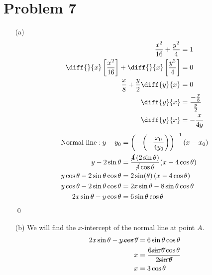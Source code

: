\documentclass{article}
\begin{document}
\section*{Problem 7}
\begin{itemize}
\item[(a)]
	\begin{align*}
		\frac{x^2}{16}+\frac{y^2}{4}&=1 \\
		\diff{}{x}\left[\frac{x^2}{16}\right]+\diff{}{x}\left[\frac{y^2}{4}\right]&=0 \\
		\frac{x}{8}+\frac{y}{2}\diff{y}{x}&=0 \\
		\diff{y}{x}&=\frac{-\frac{x}{8}}{\frac{y}{2}} \\
		\diff{y}{x}&=-\frac{x}{4y}
	\end{align*}
	\begin{align*}
		\text{Normal line}:y-y_0&=\left(-\left(-\frac{x_0}{4y_0}\right)\right)^{-1}(x-x_0) \\
		y-2\sin\theta&=\frac{\cancel{4}\left(2\sin\theta\right)}{\cancel{4}\cos\theta}(x-4\cos\theta) \\
		y\cos\theta-2\sin\theta\cos\theta&=2\sin(\theta)\left(x-4\cos\theta\right) \\
		y\cos\theta-2\sin\theta\cos\theta&=2x\sin\theta-8\sin\theta\cos\theta \\
		2x\sin\theta-y\cos\theta&=6\sin\theta\cos\theta
	\end{align*}
	\qed

\item[(b)]
	We will find the $x$-intercept of the normal line at point $A$.
	\begin{align*}
		2x\sin\theta-\cancel{y\cos\theta}&=6\sin\theta\cos\theta \\
		x&=\frac{6\cancel{\sin\theta}\cos\theta}{2\cancel{\sin\theta}} \\
		x&=3\cos\theta
	\end{align*}


\end{itemize}
\end{document}
